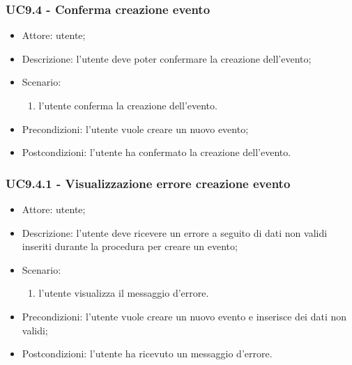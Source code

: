 \subsubsection{UC9.4 - Conferma creazione evento} \label{sec: UC9.4}
\begin{itemize}
    \item Attore: utente;
    \item Descrizione: l'utente deve poter confermare la creazione dell'evento;
    \item Scenario:
        \begin{enumerate}
        \item l'utente conferma la creazione dell'evento.
        \end{enumerate}
    
    \item Precondizioni: l'utente vuole creare un nuovo evento;
    \item Postcondizioni: l'utente ha confermato la creazione dell'evento.
\end{itemize}

\subsubsection{UC9.4.1 - Visualizzazione errore creazione evento} \label{sec: UC9.4.1}
\begin{itemize}
    \item Attore: utente;
    \item Descrizione: l'utente deve ricevere un errore a seguito di dati non validi inseriti durante la procedura per creare un evento;
    \item Scenario:
        \begin{enumerate}
        \item l'utente visualizza il messaggio d'errore.
        \end{enumerate}
    
    \item Precondizioni: l'utente vuole creare un nuovo evento e inserisce dei dati non validi;
    \item Postcondizioni: l'utente ha ricevuto un messaggio d'errore.
\end{itemize}



